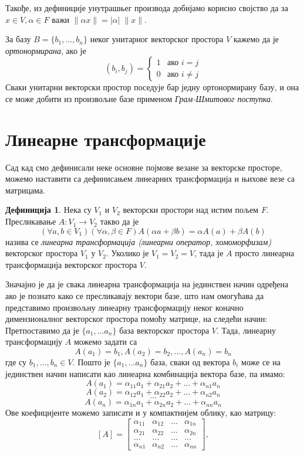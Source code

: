 \documentclass{report}
\theoremstyle{plain}
\theoremstyle{definition}
\newtheorem*{defn}{Дефиниција}
\begin{document}
Такође, из дефиниције унутрашњег производа добијамо корисно својство да за $x\in V, \alpha \in F$ важи $\|\alpha x\| = |\alpha|\; \|x\|$.

За базу $B=\{b_1, ..., b_n\}$ неког унитарног векторског простора $V$ кажемо да је \emph{ортонормирана}, ако је
$$(b_i, b_j) = \begin{cases}
                1 & \mbox{ако } i=j \\
                0 & \mbox{ако } i\neq j
               \end{cases}$$
Сваки унитарни векторски простор поседује бар једну ортонормирану базу, и она се може добити из произвољне базе применом \emph{Грам-Шмитовог поступка}\cite{milic}.

\section{Линеарне трансформације}
Сад кад смо дефинисали неке основне појмове везане за векторске просторе, можемо наставити са дефинисањем линеарних трансформација и њихове везе са матрицама.
\begin{defn}
Нека су $V_1$ и $V_2$ векторски простори над истим пољем $F$. Пресликавање $A: V_1\to V_2$ такво да је
$$(\forall a, b\in V_1)(\forall \alpha, \beta \in F) A(\alpha a+ \beta b) = \alpha A(a) + \beta A(b)$$
назива се \emph{линеарна трансформација (линеарни оператор, хомоморфизам)} векторског простора $V_1$ у $V_2$. Уколико је $V_1 = V_2 = V$, тада је $A$ просто линеарна трансформација векторског простора $V$.
\end{defn}
Значајно је да је свака линеарна трансформација на јединствен начин одређена ако је познато како се пресликавају вектори базе, што нам омогућава да представимо произвољну линеарну трансформацију неког коначно димензионалног векторског простора помоћу матрице, на следећи начин:\\
Претпоставимо да је $\{a_1, ...a_n\}$ база векторског простора $V$. Тада, линеарну трансформацију $A$ можемо задати са
$$A(a_1) = b_1, A(a_2) = b_2, ..., A(a_n) = b_n$$
где су $b_1, ..., b_n\in V$. Пошто је $\{a_1, ...a_n\}$ база, сваки од вектора $b_i$ може се на јединствен начин написати као линеарна комбинација вектора базе, па имамо:
$$A(a_1) = \alpha_{11}a_1 + \alpha_{21}a_2 + ... + \alpha_{n1}a_n$$
$$A(a_2) = \alpha_{12}a_1 + \alpha_{22}a_2 + ... + \alpha_{n2}a_n$$
$$...$$
$$A(a_n) = \alpha_{1n}a_1 + \alpha_{2n}a_2 + ... + \alpha_{nn}a_n$$
Ове коефицијенте можемо записати и у компактнијем облику, као матрицу:
$$[A] = \begin{bmatrix}
    \alpha_{11} & \alpha_{12} & ... & \alpha_{1n} \\
    \alpha_{21} & \alpha_{22} & ... & \alpha_{2n} \\
    ... & ... & ... & ... \\
    \alpha_{n1} & \alpha_{n2} & ... & \alpha_{nn}
  \end{bmatrix},$$
\end{document}
